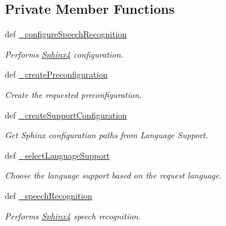 \subsection*{Private Member Functions}
\begin{DoxyCompactItemize}
\item 
def \hyperlink{classrapp__speech__detection__sphinx4_1_1speech__recognition__sphinx4_1_1SpeechRecognitionSphinx4_a0451d1c7c9a308255d5e93f47b0664f2}{\-\_\-configure\-Speech\-Recognition}
\begin{DoxyCompactList}\small\item\em Performs \hyperlink{classSphinx4}{Sphinx4} configuration. \end{DoxyCompactList}\item 
def \hyperlink{classrapp__speech__detection__sphinx4_1_1speech__recognition__sphinx4_1_1SpeechRecognitionSphinx4_a8b10d0955c0592b98e05b1f5f1cad26a}{\-\_\-create\-Preconfiguration}
\begin{DoxyCompactList}\small\item\em Create the requested preconfiguration. \end{DoxyCompactList}\item 
def \hyperlink{classrapp__speech__detection__sphinx4_1_1speech__recognition__sphinx4_1_1SpeechRecognitionSphinx4_a54a006faca9b32d191e3e4863621a83a}{\-\_\-create\-Support\-Configuration}
\begin{DoxyCompactList}\small\item\em Get Sphinx configuration paths from Language Support. \end{DoxyCompactList}\item 
def \hyperlink{classrapp__speech__detection__sphinx4_1_1speech__recognition__sphinx4_1_1SpeechRecognitionSphinx4_a5ceb0deed7c1dfb1d8bb21c2a401fc93}{\-\_\-select\-Language\-Support}
\begin{DoxyCompactList}\small\item\em Choose the language support based on the request language. \end{DoxyCompactList}\item 
def \hyperlink{classrapp__speech__detection__sphinx4_1_1speech__recognition__sphinx4_1_1SpeechRecognitionSphinx4_a5256ab73fc56d7db4f6e55b36774fa44}{\-\_\-speech\-Recognition}
\begin{DoxyCompactList}\small\item\em Performs \hyperlink{classSphinx4}{Sphinx4} speech recognition. \end{DoxyCompactList}\end{DoxyCompactItemize}
